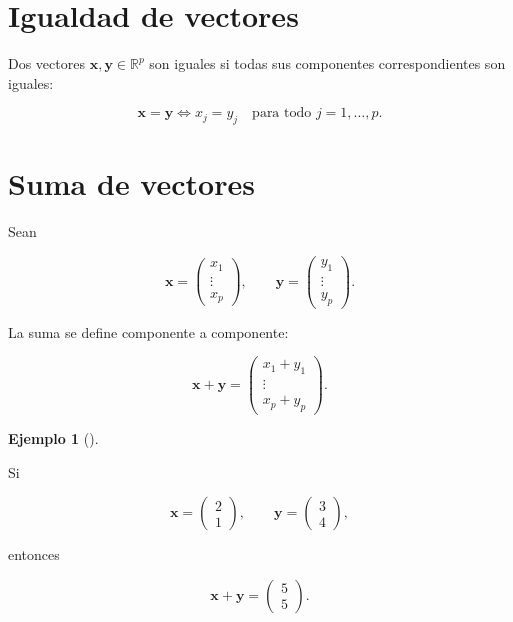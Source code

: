 \documentclass[
  spanish,
  11pt,
  letterpaper,
  DIV=11,
  numbers=noendperiod]{scrreprt}
\theoremstyle{definition}
\theoremstyle{plain}
\theoremstyle{definition}
\newtheorem{example}{Ejemplo}[chapter]
\theoremstyle{remark}
\begin{document}
\section{Igualdad de vectores}\label{igualdad-de-vectores}

Dos vectores \(\mathbf{x},\mathbf{y}\in\mathbb{R}^{p}\) son iguales si
todas sus componentes correspondientes son iguales:

\[
\mathbf{x}=\mathbf{y}
\iff
x_j=y_j
\quad
\text{para todo }j=1,\ldots,p.
\]

\section{Suma de vectores}\label{suma-de-vectores}

Sean

\[
\mathbf{x}
=
\begin{pmatrix}
x_1\\
\vdots\\
x_p
\end{pmatrix},
\qquad
\mathbf{y}
=
\begin{pmatrix}
y_1\\
\vdots\\
y_p
\end{pmatrix}.
\]

La suma se define componente a componente:

\[
\mathbf{x}+\mathbf{y}
=
\begin{pmatrix}
x_1+y_1\\
\vdots\\
x_p+y_p
\end{pmatrix}.
\]

\begin{example}[]\protect\hypertarget{exm-suma-vectores}{}\label{exm-suma-vectores}

Si

\[
\mathbf{x}
=
\begin{pmatrix}
2\\
1
\end{pmatrix},
\qquad
\mathbf{y}
=
\begin{pmatrix}
3\\
4
\end{pmatrix},
\]

entonces

\[
\mathbf{x}+\mathbf{y}
=
\begin{pmatrix}
5\\
5
\end{pmatrix}.
\]

\end{example}
\end{document}

